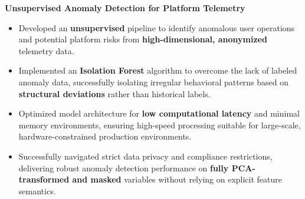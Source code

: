 \begin{cventries}
{\begin{cvitems}
      \item {\textbf{Unsupervised Anomaly Detection for Platform Telemetry}}
        \begin{itemize}
          \item {
            Developed an \textbf{unsupervised} pipeline to identify anomalous user operations 
            and potential platform risks from \textbf{high-dimensional, anonymized} telemetry data.
          }
          \item {
            Implemented an \textbf{Isolation Forest} algorithm to overcome the lack of labeled anomaly data, 
            successfully isolating irregular behavioral patterns based on \textbf{structural deviations} 
            rather than historical labels.
          }
          \item {
            Optimized model architecture for \textbf{low computational latency} and 
            minimal memory environments, ensuring high-speed processing suitable for large-scale, 
            hardware-constrained production environments.
          }
          \item {
            Successfully navigated strict data privacy and compliance restrictions, 
            delivering robust anomaly detection performance on 
            \textbf{fully PCA-transformed and masked} variables without 
            relying on explicit feature semantics.
          }
        \end{itemize}
    \end{cvitems}
  }


\end{cventries}
